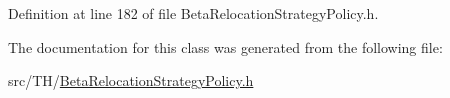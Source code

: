 Definition at line 182 of file Beta\+Relocation\+Strategy\+Policy.\+h.



The documentation for this class was generated from the following file\+:\begin{DoxyCompactItemize}
\item 
src/\+T\+H/\hyperlink{BetaRelocationStrategyPolicy_8h}{Beta\+Relocation\+Strategy\+Policy.\+h}\end{DoxyCompactItemize}
